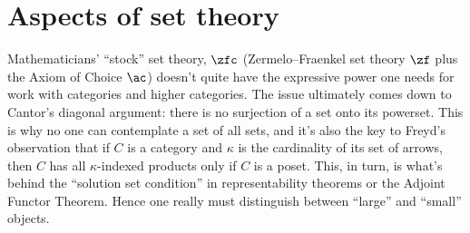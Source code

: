 
\chapter{Aspects of set theory}%
\label{cha:aspects_of_set_theory}

Mathematicians' \enquote{stock} set theory, $\zfc$ (Zermelo--Fraenkel set theory $\zf$ plus the Axiom of Choice $\ac$) doesn't quite have the expressive power one needs for work with categories and higher categories.
The issue ultimately comes down to Cantor's diagonal argument:
there is no surjection of a set onto its powerset.
This is why no one can contemplate a set of all sets,
and it's also the key to Freyd's observation that if $C$ is a category and $\kappa$ is the cardinality of its set of arrows,
then $C$ has all $\kappa$-indexed products only if $C$ is a poset.
This, in turn, is what's behind the \enquote{solution set condition} in representability theorems or the Adjoint Functor Theorem.
Hence one really must distinguish between \enquote{large} and \enquote{small} objects.

